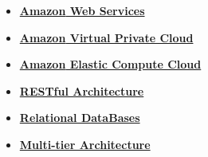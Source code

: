 \begin{itemize}
    \item \href{https://aws.amazon.com/it/}{\textbf{Amazon\textsuperscript{\textcopyright} Web Services}}
    \item \href{https://aws.amazon.com/it/vpc/}{\textbf{Amazon\textsuperscript{\textcopyright} Virtual Private Cloud}}
    \item \href{https://aws.amazon.com/it/ec2/}{\textbf{Amazon\textsuperscript{\textcopyright} Elastic Compute Cloud}}
    \item \href{https://www.geeksforgeeks.org/rest-api-architectural-constraints/}{\textbf{RESTful Architecture}}
    \item \href{https://en.wikipedia.org/wiki/Relational_database}{\textbf{Relational DataBases}}
    \item \href{https://en.wikipedia.org/wiki/Multitier_architecture}{\textbf{Multi-tier Architecture}}
\end{itemize}
